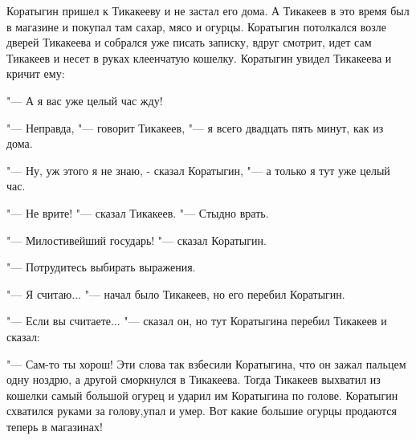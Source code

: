 Коратыгин пришел к Тикакееву и не застал его дома.
А Тикакеев в это время был  в магазине и покупал там  сахар, мясо и огурцы.
Коратыгин  потолкался возле дверей Тикакеева  и собрался уже писать записку,  вдруг смотрит, идет сам Тикакеев и несет в руках клеенчатую кошелку.
    Коратыгин увидел Тикакеева и кричит ему:

    "--- А я вас уже целый час жду!

    "--- Неправда, "--- говорит Тикакеев, "--- я всего двадцать пять минут, как из дома.

    "--- Ну, уж этого я не знаю, - сказал Коратыгин, "--- а только я тут уже целый час.

    "--- Не врите! "--- сказал Тикакеев. "---  Стыдно врать.

    "--- Милостивейший государь! "--- сказал Коратыгин.
    
    "--- Потрудитесь выбирать выражения.

    "--- Я считаю... "--- начал было Тикакеев, но его перебил Коратыгин.

    "--- Если вы считаете... "--- сказал он, но тут Коратыгина перебил Тикакеев и сказал:

    "--- Сам-то ты хорош! Эти слова так взбесили  Коратыгина, что он зажал пальцем одну ноздрю, а другой сморкнулся в Тикакеева.
    Тогда Тикакеев выхватил из кошелки самый большой огурец и ударил им Коратыгина по голове.
    Коратыгин  схватился  руками  за голову,упал и умер.
    Вот  какие большие огурцы  продаются теперь в магазинах!